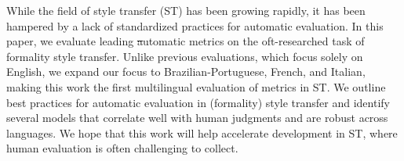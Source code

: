 While the field of style transfer (ST) has been growing rapidly, it has been hampered by a lack of standardized practices for automatic evaluation.  In this paper, we evaluate leading \st automatic metrics on the oft-researched task of formality style transfer.  Unlike previous evaluations, which focus solely on English, we expand our focus to Brazilian-Portuguese, French, and Italian, making this work the first multilingual evaluation of metrics in ST. We outline best practices for automatic evaluation in (formality) style transfer and identify several models that correlate well with human judgments and are robust across languages.  We hope that this work will help accelerate development in ST, where human evaluation is often challenging to collect.
